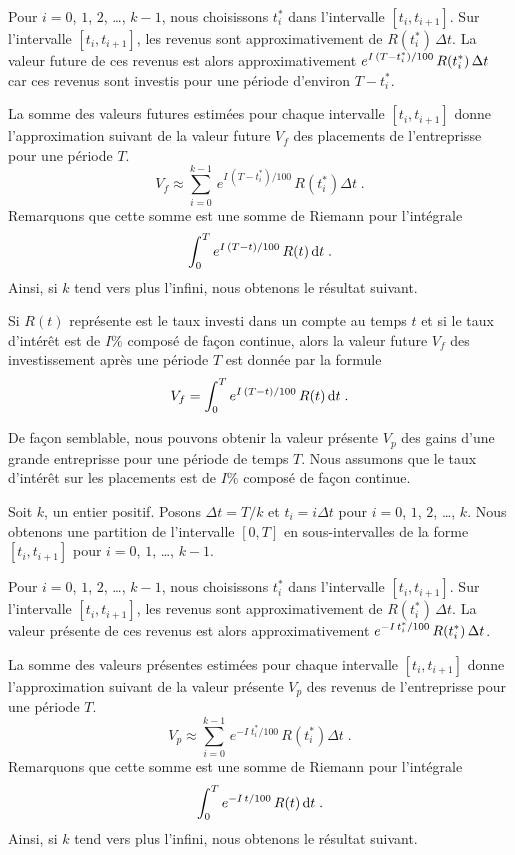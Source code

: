 {Pour $i=0$, $1$, $2$, \ldots, $k-1$, nous choisissons $t_i^\ast$ dans
l'intervalle $[t_i,t_{i+1}]$.  Sur l'intervalle $[t_i, t_{i+1}]$, les
revenus sont approximativement de $R(t_i^\ast)\, \Delta t$.  La valeur
future de ces revenus est alors approximativement
$\displaystyle e^{I\,(T-t_i^\ast)/100} \,R(t_i^\ast)\, \Delta t$ car ces
revenus sont investis pour une période d'environ $T-t_i^\ast$.

La somme des valeurs futures estimées pour chaque intervalle
$[t_i,t_{i+1}]$ donne l'approximation suivant de la valeur future $V_f$
des placements de l'entreprisse pour une période $T$.
\[
V_f \approx \sum_{i=0}^{k-1} \,e^{I\,(T-t_i^\ast)/100} \,R(t_i^\ast) \Delta t \; .
\]
Remarquons que cette somme est une somme de Riemann pour l'intégrale
\[
\int_0^T e^{I\,(T-t)/100} \,R(t) \,\mathrm{d}t \; .
\]
Ainsi, si $k$ tend vers plus l'infini, nous obtenons le résultat suivant.

\begin{meth} 
Si $R(t)$ représente est le taux investi dans un compte au temps $t$
et si le taux d'intérêt est de $I$\% composé de façon continue, alors la
valeur future $V_f$ des investissement après une période $T$ est
donnée par la formule
\[
V_f = \int_0^T e^{I\,(T-t)/100} \,R(t) \,\mathrm{d}t \; .
\]
\end{meth}

De façon semblable, nous pouvons obtenir la valeur présente $V_p$ des gains
d'une grande entreprisse pour une période de temps $T$.  Nous assumons que
le taux d'intérêt sur les placements est de $I$\% composé de façon
continue.

Soit $k$, un entier positif.  Posons
$\Delta t = T/k$ et $t_i = i \Delta t$
pour $i=0$, $1$, $2$, \ldots, $k$.  Nous obtenons une partition de l'intervalle
$[0,T]$ en sous-intervalles de la forme $[t_i,t_{i+1}]$ pour $i=0$, $1$,
\ldots, $k-1$.

Pour $i=0$, $1$, $2$, \ldots, $k-1$, nous choisissons $t_i^\ast$ dans
l'intervalle $[t_i,t_{i+1}]$.  Sur l'intervalle $[t_i, t_{i+1}]$, les
revenus sont
approximativement de $R(t_i^\ast)\, \Delta t$.  La valeur présente de ces
revenus est alors approximativement
$\displaystyle e^{-I\,t_i^\ast/100} \,R(t_i^\ast)\, \Delta t$.

La somme des valeurs présentes estimées pour chaque intervalle
$[t_i,t_{i+1}]$ donne l'approximation suivant de la valeur présente
$V_p$ des revenus de l'entreprisse pour une période $T$.
\[
V_p \approx \sum_{i=0}^{k-1} \,e^{-I\;t_i^\ast/100} \,R(t_i^\ast)
\Delta t \; .
\]
Remarquons que cette somme est une somme de Riemann pour l'intégrale
\[
\int_0^T e^{-I\,t/100} \,R(t) \,\mathrm{d}t \; .
\]
Ainsi, si $k$ tend vers plus l'infini, nous obtenons le résultat suivant.

}
